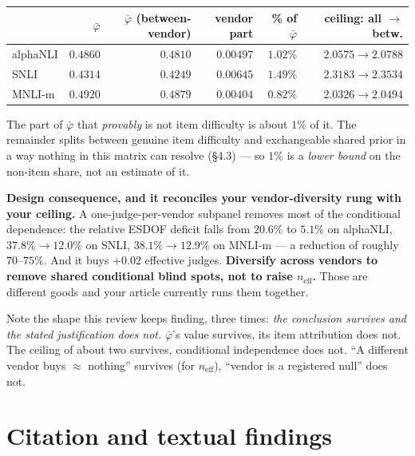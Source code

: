 \documentclass[11pt]{article}
\theoremstyle{definition}
\newcommand{\phib}{\bar\varphi}
\begin{document}
\begin{center}
\begin{tabular}{lrrrrr}
\toprule
 & $\phib$ & $\phib$ (between-vendor) & vendor part & \% of $\phib$ & ceiling: all $\to$ betw.\\
\midrule
alphaNLI & $0.4860$ & $0.4810$ & $0.00497$ & $1.02\%$ & $2.0575\to2.0788$\\
SNLI     & $0.4314$ & $0.4249$ & $0.00645$ & $1.49\%$ & $2.3183\to2.3534$\\
MNLI-m   & $0.4920$ & $0.4879$ & $0.00404$ & $0.82\%$ & $2.0326\to2.0494$\\
\bottomrule
\end{tabular}
\end{center}

\noindent The part of $\phib$ that \emph{provably} is not item difficulty is about
$1\%$ of it. The remainder splits between genuine item difficulty and exchangeable
shared prior in a way nothing in this matrix can resolve (\S4.3) --- so $1\%$ is a
\emph{lower bound} on the non-item share, not an estimate of it.

\textbf{Design consequence, and it reconciles your vendor-diversity rung with your
ceiling.} A one-judge-per-vendor subpanel removes most of the conditional
dependence: the relative ESDOF deficit falls from $20.6\%$ to $5.1\%$ on alphaNLI,
$37.8\%\to12.0\%$ on SNLI, $38.1\%\to12.9\%$ on MNLI-m --- a reduction of roughly
$70$--$75\%$. And it buys $+0.02$ effective judges. \textbf{Diversify across vendors
to remove shared conditional blind spots, not to raise $n_{\mathrm{eff}}$.} Those are
different goods and your article currently runs them together.

Note the shape this review keeps finding, three times: \emph{the conclusion survives
and the stated justification does not.} $\phib$'s value survives, its
item attribution does not. The ceiling of about two survives, conditional
independence does not. ``A different vendor buys $\approx$ nothing'' survives (for
$n_{\mathrm{eff}}$), ``vendor is a registered null'' does not.

\section{Citation and textual findings}
\end{document}
